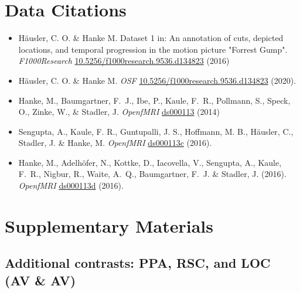 \documentclass[english]{article}
\begin{document}
\section{Data Citations}

\begin{itemize}
\item Häusler, C. O. \& Hanke M. Dataset 1 in: An annotation of cuts, depicted
locations, and temporal progression in the motion picture "Forrest Gump".
\emph{F1000Research}
\href{https://doi.org/10.5256/f1000research.9536.d134823}{10.5256/f1000research.9536.d134823}
(2016)

\item Häusler, C. O. \& Hanke M. \emph{OSF}
\href{https://doi.org/10.17605/OSF.IO/GFRME}{10.5256/f1000research.9536.d134823}
(2020).

\item Hanke, M., Baumgartner, F.~J., Ibe, P., Kaule, F.~R., Pollmann, S., Speck, O.,
  Zinke, W., \& Stadler, J. \emph{OpenfMRI} \href{https://openfmri.org/dataset/ds000113}{ds000113} (2014)

\item Sengupta, A., Kaule, F. R., Guntupalli, J. S., Hoffmann, M. B., Häusler, C., Stadler, J. \& Hanke, M.
  \emph{OpenfMRI} \href{https://openfmri.org/dataset/ds000113c}{ds000113c} (2016).

\item Hanke, M., Adelhöfer, N., Kottke, D., Iacovella, V., Sengupta, A., Kaule, F.~R., Nigbur, R., Waite, A.~Q.,
  Baumgartner, F.~J. \& Stadler, J. (2016).
  \emph{OpenfMRI} \href{https://openfmri.org/dataset/ds000113d}{ds000113d} (2016).
\end{itemize}


\appendix

\pagebreak[4]

\setcounter{figure}{0}
\makeatletter
\renewcommand{\thefigure}{S\@arabic\c@figure}
\makeatother

\section{Supplementary Materials}

\subsection{Additional contrasts: PPA, RSC, and LOC (AV \& AV)}

\end{document}
